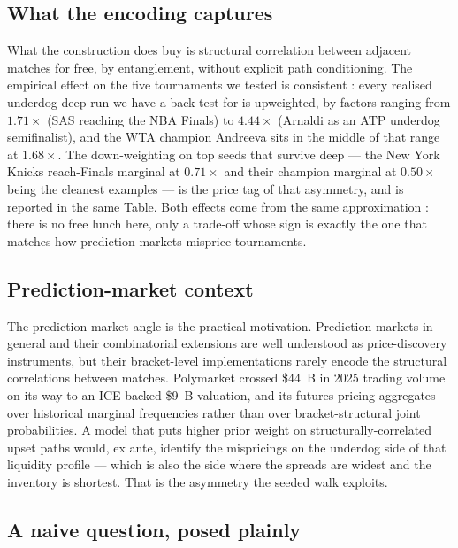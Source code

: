 \documentclass[11pt]{article}
\begin{document}
\subsection{What the encoding captures}

What the construction does buy is structural correlation between
adjacent matches for free, by entanglement, without explicit path
conditioning. The empirical effect on the five tournaments we tested
is consistent : every realised underdog deep run we have a
back-test for is upweighted, by factors ranging from $1.71\times$
(SAS reaching the NBA Finals) to $4.44\times$ (Arnaldi as an ATP
underdog semifinalist), and the WTA champion Andreeva sits in the
middle of that range at $1.68\times$. The down-weighting on top
seeds that survive deep --- the New York Knicks reach-Finals
marginal at $0.71\times$ and their champion marginal at
$0.50\times$ being the cleanest examples --- is the price tag of
that asymmetry, and is reported in the same Table.
Both effects come from the same approximation : there is no free
lunch here, only a trade-off whose sign is exactly the one that
matches how prediction markets misprice tournaments.

\subsection{Prediction-market context}

The prediction-market angle is the practical motivation. Prediction
markets in general \cite{wolfers2004prediction} and their
combinatorial extensions \cite{hanson2003combinatorial} are well
understood as price-discovery instruments, but their bracket-level
implementations rarely encode the structural correlations between
matches. Polymarket crossed \$44~B in 2025 trading volume on its way
to an ICE-backed \$9~B valuation, and its futures pricing aggregates
over historical marginal frequencies rather than over
bracket-structural joint probabilities. A model that puts higher prior weight on
structurally-correlated upset paths would, ex ante, identify the
mispricings on the underdog side of that liquidity profile --- which
is also the side where the spreads are widest and the inventory is
shortest. That is the asymmetry the seeded walk exploits.

\subsection{A naive question, posed plainly}
\label{sec:candide}
\end{document}
